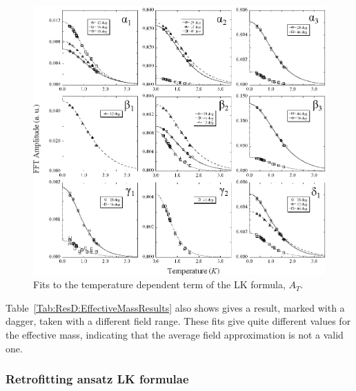 \begin{figure}[htbp]
    \begin{center}
        \includegraphics[scale=0.9]{Chapter-dHvABaFe2P2/Figures/Mass/SimpleLKFits/SimpleLKFits}
        \caption{Fits to the temperature dependent term of the \ac{LK} formula, $A_T$.}
        \label{Fig:ResD:SimpleLKFits}
    \end{center}
\end{figure}
Table~\ref{Tab:ResD:EffectiveMassResults} also shows gives a result, marked with a dagger, taken with a different field range. These fits give quite different values for the effective mass, indicating that the average field approximation is not a valid one.

\subsubsection{Retrofitting ansatz \ac{LK} formulae}

